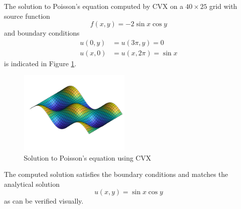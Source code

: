 \documentclass[conference]{IEEEtran}
\begin{document}
The solution to Poisson's equation computed by CVX on a $40 \times 25$ grid with source function
\begin{equation}
  f(x, y) = -2 \sin x \cos y
\end{equation}
and boundary conditions
\begin{align}
  u(0, y) &= u(3\pi, y) = 0 \\
  u(x, 0) &= u(x, 2\pi) = \sin x
\end{align}
is indicated in Figure \ref{fig:poisson-solution}.
\begin{figure}[b]
  \begin{center}
    \includegraphics[width=0.48\textwidth]{figures/poisson-solution}
    \caption{Solution to Poisson's equation using CVX}
    \label{fig:poisson-solution}
  \end{center}
\end{figure}
The computed solution satisfies the boundary conditions and matches the analytical solution
\begin{equation}
  u(x, y) = \sin x \cos y
\end{equation}
as can be verified visually.
\end{document}
